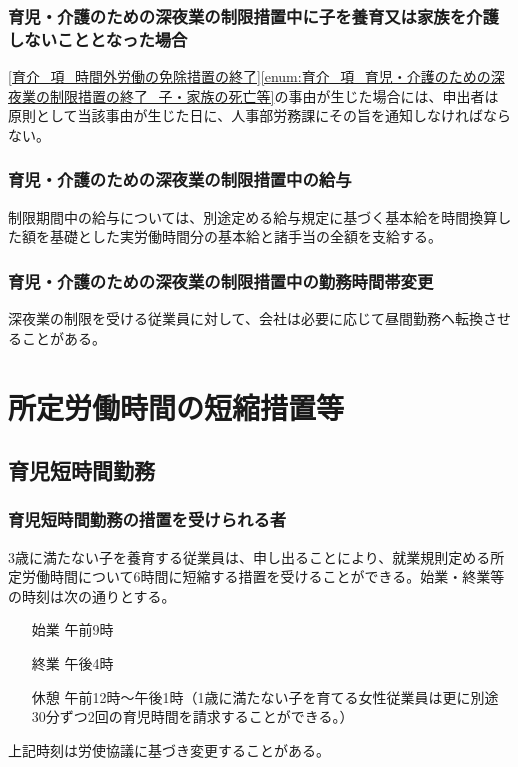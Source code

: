 \documentclass{jsarticle}
\begin{document}
\subsubsection{育児・介護のための深夜業の制限措置中に子を養育又は家族を介護しないこととなった場合}
\label{育介_項_育児・介護のための深夜業の制限措置中に子を養育又は家族を介護しないこととなった場合}
\ref{育介_項_時間外労働の免除措置の終了}\ref{enum:育介_項_育児・介護のための深夜業の制限措置の終了_子・家族の死亡等}の事由が生じた場合には、申出者は原則として当該事由が生じた日に、人事部労務課にその旨を通知しなければならない。

\subsubsection{育児・介護のための深夜業の制限措置中の給与}
\label{育介_項_育児・介護のための深夜業の制限措置中の給与}
制限期間中の給与については、別途定める給与規定に基づく基本給を時間換算した額を基礎とした実労働時間分の基本給と諸手当の全額を支給する。
\subsubsection{育児・介護のための深夜業の制限措置中の勤務時間帯変更}
\label{育介_項_育児・介護のための深夜業の制限措置中の勤務時間帯変更}
深夜業の制限を受ける従業員に対して、会社は必要に応じて昼間勤務ヘ転換させることがある。 

\section{所定労働時間の短縮措置等}

\subsection{育児短時間勤務}
\label{育介_条_育児短時間勤務}

\subsubsection{育児短時間勤務の措置を受けられる者}
\label{育介_項_育児短時間勤務の措置を受けられる者}
3歳に満たない子を養育する従業員は、申し出ることにより、就業規則定める所定労働時間について6時間に短縮する措置を受けることができる。始業・終業等の時刻は次の通りとする。
\begin{enumerate}
  \item[始業]午前9時
  \item[終業]午後4時
  \item[休憩]午前12時〜午後1時（1歳に満たない子を育てる女性従業員は更に別途30分ずつ2回の育児時間を請求することができる。）
\end{enumerate}
上記時刻は労使協議に基づき変更することがある。
\end{document}
